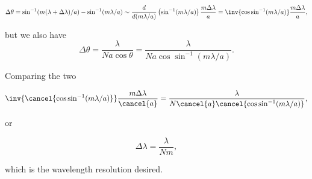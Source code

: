 {\begin{dmath}\label{eqn:modernOptics:problemSet3:3:480}
\Delta \theta
=
\sin^{-1}(m (\lambda + \Delta \lambda)/a)
-
\sin^{-1}(m \lambda/ a)
\sim
\frac{d}{d (m\lambda/a)} \left( \sin^{-1}(m \lambda/ a) \right) \frac{ m \Delta \lambda}{a}
=
\inv{\cos\sin^{-1} (m \lambda/a)}
\frac{ m \Delta \lambda}{a},
\end{dmath}

but we also have
\begin{dmath}\label{eqn:modernOptics:problemSet3:3:500}
\Delta \theta
=
\frac{\lambda}{N a \cos\theta}
=
\frac{\lambda}{N a \cos\sin^{-1}(m \lambda/a)}.
\end{dmath}

Comparing the two

\begin{dmath}\label{eqn:modernOptics:problemSet3:3:520}
\inv{\cancel{\cos\sin^{-1} (m \lambda/a)}}
\frac{ m \Delta \lambda}{\cancel{a}}
=
\frac{\lambda}{N \cancel{a} \cancel{\cos\sin^{-1}(m \lambda/a)}},
\end{dmath}

or

\begin{dmath}\label{eqn:modernOptics:problemSet3:3:540}
\boxed{
\Delta \lambda
=
\frac{\lambda}{N m},
}
\end{dmath}

which is the wavelength resolution desired.

} %

